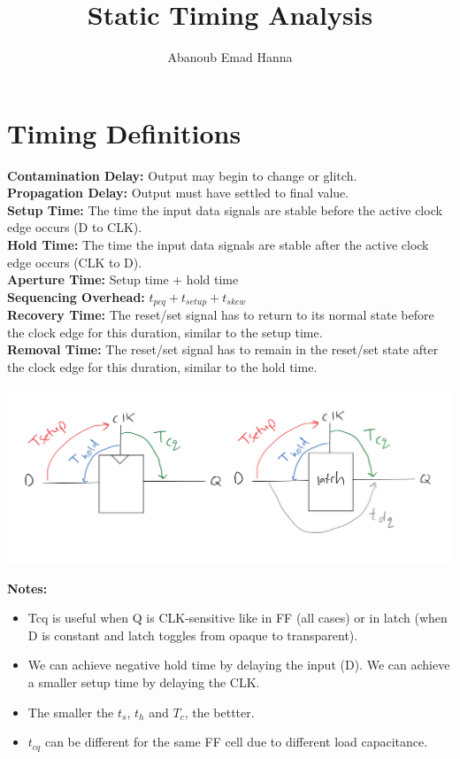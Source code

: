 \documentclass[11pt]{article}
\title{Static Timing Analysis}
\author{Abanoub Emad Hanna}
\date{}
\begin{document}
\maketitle

\section*{Timing Definitions}
    \textbf{Contamination Delay:} Output may begin to change or glitch.\\
    \textbf{Propagation Delay:} Output must have settled to final value. \\
    \textbf{Setup Time:} The time the input data signals are stable before the active clock edge occurs (D to CLK). \\
    \textbf{Hold Time:} The time the input data signals are stable after the active clock edge occurs (CLK to D). \\
    \textbf{Aperture Time:} Setup time + hold time \\
    \textbf{Sequencing Overhead:} $t_{pcq}+t_{setup}+t_{skew}$ \\
    \textbf{Recovery Time:} The reset/set signal has to return to its normal state before the clock edge for this duration, similar to the setup time.\\
    \textbf{Removal Time:} The reset/set signal has to remain in the reset/set state after the clock edge for this duration, similar to the hold time.\\

    \begin{center}
        \centering
        \vspace{-20pt}
        \includegraphics[scale=0.5]{1}
        \vspace{-40pt}
    \end{center}
    \textbf{Notes:}
    \begin{itemize}
        \item Tcq is useful when Q is CLK-sensitive like in FF (all cases) or in latch (when D is constant and latch toggles from opaque to transparent).
        \item We can achieve negative hold time by delaying the input (D). We can achieve a smaller setup time by delaying the CLK.
        \item The smaller the $t_s$, $t_h$ and $T_c$, the bettter.
        \item $t_{cq}$ can be different for the same FF cell due to different load capacitance.
    \end{itemize}
    
\end{document}
